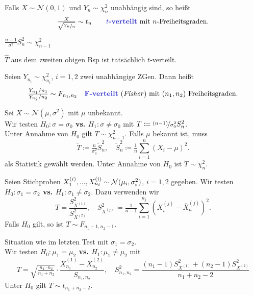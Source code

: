 \documentclass{cheat-sheet}
\newcommand{\testh}[1]{\textcolor{TestColor}{\textbf{#1}}}
\newcommand{\Normal}{\mathcal{N}} %
\begin{document}
\begin{defn}
  Falls $X \sim \Normal(0,1)$ und $Y_n \sim \chi_n^2$ unabhängig sind, so heißt
  \[
    \tfrac{X}{\sqrt{\nicefrac{Y_n}{n}}} \sim t_n
    \qquad \text{\emph{$t$-verteilt} mit $n$-Freiheitsgraden.}
  \]
\end{defn}

\begin{lem}
  $\tfrac{n-1}{\sigma^2} S_n^2 \sim \chi_{n-1}^2$
\end{lem}

\begin{kor}
  $\hat{T}$ aus dem zweiten obigen Bsp ist tatsächlich $t$-verteilt.
\end{kor}

\begin{defn}
  Seien $Y_{n_i} \sim \chi_{n_i}^2$, $i = 1, 2$ zwei unabhängige ZGen.
  Dann heißt %
  \[
    \tfrac{Y_{n_1} / n_1}{Y_{n_2} / n_2} \sim F_{n_1, n_2} \quad
    \text{\emph{F-verteilt} (\textit{Fisher}) mit $(n_1, n_2)$ Freiheitsgraden.}
  \]
\end{defn}


\begin{test}
  Sei $X \sim \Normal(\mu, \sigma^2)$ mit $\mu$ unbekannt. \\
  Wir testen \testh{$H_0 : \sigma = \sigma_0$ vs. $H_1 : \sigma \neq \sigma_0$} mit
  $T \coloneqq \nicefrac{(n-1)}{\sigma_0^2} S_n^2$. \\
  Unter Annahme von $H_0$ gilt $T \sim \chi_{n-1}^2$.
  Falls $\mu$ bekannt ist, muss
  \[
    \widetilde{T} \coloneqq \tfrac{n}{\sigma_0^2} \widetilde{S}_n^2, \quad
    \widetilde{S}_n^2 \coloneqq \tfrac{1}{n} \sum_{i=1}^n (X_i - \mu)^2.
  \]
  als Statistik gewählt werden.
  Unter Annahme von $H_0$ ist $\widetilde{T} \sim \chi_n^2$.
\end{test}

\begin{test}
  Seien Stichproben $X_1^{(i)}, \nldots, X_{n_i}^{(i)} \sim \Normal(\mu_i, \sigma_i^2)$, $i = 1, 2$ gegeben.
  Wir testen \testh{$H_0 : \sigma_1 = \sigma_2$ vs. $H_1 : \sigma_1 \neq \sigma_2$}.
  Dazu verwenden wir
  \[
    T = \frac{S_{X^{(1)}}^2}{S_{X^{(2)}}^2}, \quad
    S_{X^{(j)}}^2 \coloneqq \tfrac{1}{n-1} \sum_{i=1}^{n_j} \left( X_i^{(j)} - \overline{X}^{(j)}_n \right)^2.
  \]
  Falls $H_0$ gilt, so ist $T \sim F_{n_1-1,n_2-1}$.
\end{test}

\begin{test}
  Situation wie im letzten Test mit $\sigma_1 = \sigma_2$. \\
  Wir testen \testh{$H_0 : \mu_1 = \mu_2$ vs. $H_1 : \mu_1 \neq \mu_2$} mit
  \[
    T = \sqrt{\tfrac{n_1 \cdot n_2}{n_1 + n_2}} \cdot \frac{\overline{X}_{n_1}^{(1)} - \overline{X}_{n_2}^{(2)}}{S_{n_1,n_2}}, \quad
    S_{n_1,n_2}^2 = \frac{(n_1{-}1) S_{X^{(1)}}^2 + (n_2{-}1) S_{X^{(2)}}^2}{n_1 + n_2 - 2}
  \]
  Unter $H_0$ gilt $T \sim t_{n_1 + n_2 - 2}$.
\end{test}
\end{document}
